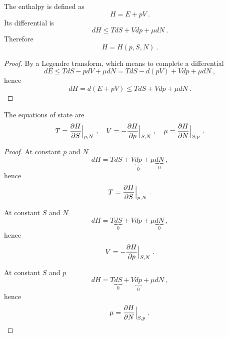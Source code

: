     The enthalpy is defined as 
    \begin{equation*}
        H = E + pV ~.
    \end{equation*}
    Its differential is 
    \begin{equation}\label{td:d:h}
        dH \leq TdS + Vdp + \mu dN ~.
    \end{equation}
    Therefore
    \begin{equation*}
        H = H(p, S, N) ~.
    \end{equation*}
    \begin{proof}
        By a Legendre transform, which means to complete a differential
        \begin{equation*}
            dE \leq T dS - p dV + \mu dN = TdS - d(pV) + V dp + \mu dN ~,
        \end{equation*}
        hence 
        \begin{equation*}
            dH = d(E + pV) \leq TdS + Vdp + \mu dN ~.
        \end{equation*}
    \end{proof}

    The equations of state are
    \begin{equation}\label{td:es:h}
        T = \frac{\partial H}{\partial S} \Big \vert_{p,N} ~, \quad V = - \frac{\partial H}{\partial p} \Big \vert_{S,N} ~, \quad \mu = \frac{\partial H}{\partial N} \Big \vert_{S, p} ~. 
    \end{equation}
    \begin{proof}
        At constant $p$ and $N$
        \begin{equation*}
            dH = TdS + V\underbrace{dp}_0 + \mu \underbrace{dN}_0 ~,
        \end{equation*}
        hence 
        \begin{equation*}
            T = \frac{\partial H}{\partial S} \Big \vert_{p,N} ~.
        \end{equation*}

        At constant $S$ and $N$
        \begin{equation*}
            dH = T\underbrace{dS}_0 + Vdp + \mu \underbrace{dN}_0~,
        \end{equation*}
        hence 
        \begin{equation*}
            V = - \frac{\partial H}{\partial p} \Big \vert_{S,N} ~.
        \end{equation*}

        At constant $S$ and $p$
        \begin{equation*}
            dH = T\underbrace{dS}_0 + V\underbrace{dp}_0 + \mu dN ~,
        \end{equation*}
        hence 
        \begin{equation*}
            \mu = \frac{\partial H}{\partial N} \Big \vert_{S, p} ~.
        \end{equation*}
    \end{proof}

